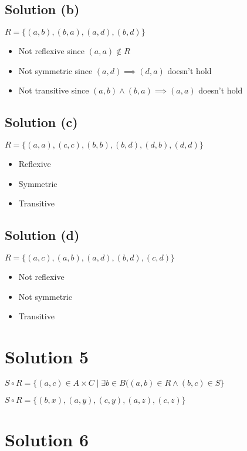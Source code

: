 \documentclass{article}
\begin{document}
\subsection{Solution (b)}

$R = \{(a,b), (b,a), (a,d), (b,d)\}$

\begin{itemize}
\item Not reflexive since $(a,a) \notin R$
\item Not symmetric since $(a,d) \implies (d,a)$ doesn't hold
\item Not transitive since $(a,b) \land (b,a) \implies (a,a)$ doesn't hold
\end{itemize}

\subsection{Solution (c)}

$R = \{(a,a), (c,c), (b,b), (b,d), (d,b), (d,d)\}$

\begin{itemize}
\item Reflexive
\item Symmetric
\item Transitive
\end{itemize}

\subsection{Solution (d)}

$R = \{(a,c), (a,b), (a,d), (b,d), (c,d)\}$

\begin{itemize}
\item Not reflexive
\item Not symmetric
\item Transitive
\end{itemize}

\section{Solution 5}

$S \circ R = \{(a,c) \in A \times C \mid \exists b \in B((a,b) \in R
\land (b,c) \in S\}$

$S \circ R = \{(b,x), (a,y), (c,y), (a,z), (c,z)\}$

\section{Solution 6}
\end{document}
